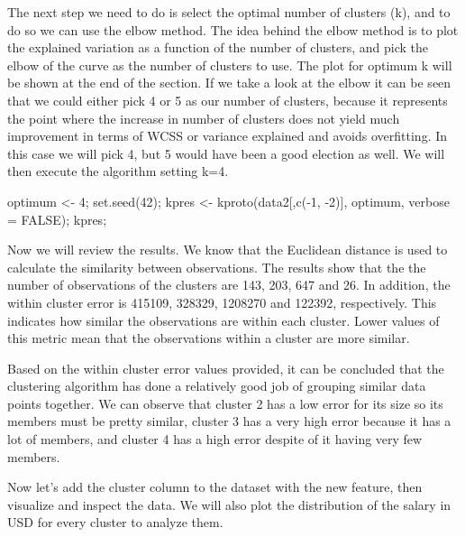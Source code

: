 \documentclass[
]{article}
\newenvironment{Shaded}{\begin{snugshade}}{\end{snugshade}}
\newcommand{\AttributeTok}[1]{\textcolor[rgb]{0.77,0.63,0.00}{#1}}
\newcommand{\ConstantTok}[1]{\textcolor[rgb]{0.00,0.00,0.00}{#1}}
\newcommand{\DecValTok}[1]{\textcolor[rgb]{0.00,0.00,0.81}{#1}}
\newcommand{\FunctionTok}[1]{\textcolor[rgb]{0.00,0.00,0.00}{#1}}
\newcommand{\NormalTok}[1]{#1}
\newcommand{\OtherTok}[1]{\textcolor[rgb]{0.56,0.35,0.01}{#1}}
\newcommand{\SpecialCharTok}[1]{\textcolor[rgb]{0.00,0.00,0.00}{#1}}
\begin{document}
The next step we need to do is select the optimal number of clusters
(k), and to do so we can use the elbow method. The idea behind the elbow
method is to plot the explained variation as a function of the number of
clusters, and pick the elbow of the curve as the number of clusters to
use. The plot for optimum k will be shown at the end of the section. If
we take a look at the elbow it can be seen that we could either pick 4
or 5 as our number of clusters, because it represents the point where
the increase in number of clusters does not yield much improvement in
terms of WCSS or variance explained and avoids overfitting. In this case
we will pick 4, but 5 would have been a good election as well. We will
then execute the algorithm setting k=4.

\scriptsize

\begin{Shaded}
\begin{Highlighting}[]
\NormalTok{optimum }\OtherTok{\textless{}{-}} \DecValTok{4}\NormalTok{; }\FunctionTok{set.seed}\NormalTok{(}\DecValTok{42}\NormalTok{); kpres }\OtherTok{\textless{}{-}} \FunctionTok{kproto}\NormalTok{(data2[,}\FunctionTok{c}\NormalTok{(}\SpecialCharTok{{-}}\DecValTok{1}\NormalTok{, }\SpecialCharTok{{-}}\DecValTok{2}\NormalTok{)], optimum, }\AttributeTok{verbose =} \ConstantTok{FALSE}\NormalTok{); kpres;}
\end{Highlighting}
\end{Shaded}

\normalsize

Now we will review the results. We know that the Euclidean distance is
used to calculate the similarity between observations. The results show
that the the number of observations of the clusters are 143, 203, 647
and 26. In addition, the within cluster error is 415109, 328329, 1208270
and 122392, respectively. This indicates how similar the observations
are within each cluster. Lower values of this metric mean that the
observations within a cluster are more similar.

Based on the within cluster error values provided, it can be concluded
that the clustering algorithm has done a relatively good job of grouping
similar data points together. We can observe that cluster 2 has a low
error for its size so its members must be pretty similar, cluster 3 has
a very high error because it has a lot of members, and cluster 4 has a
high error despite of it having very few members.

Now let's add the cluster column to the dataset with the new feature,
then visualize and inspect the data. We will also plot the distribution
of the salary in USD for every cluster to analyze them.
\end{document}
